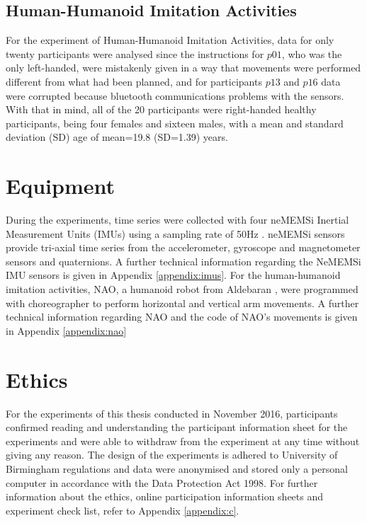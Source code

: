 \subsection{Human-Humanoid Imitation Activities}
For the experiment of Human-Humanoid Imitation Activities, 
data for only twenty participants were analysed since the instructions 
for $p01$, who was the only left-handed, were mistakenly given in a way 
that movements were performed different from what had been planned, 
and for participants $p13$ and $p16$ data were corrupted because 
bluetooth communications problems with the sensors. 
With that in mind, all of the 20 participants were right-handed 
healthy participants, being four females and sixteen males, with 
a mean and standard deviation (SD) age of mean=19.8 (SD=1.39) years.





\section{Equipment}
During the experiments, time series were collected with four neMEMSi 
Inertial Measurement Units (IMUs) using a sampling rate of 50Hz 
\citep{Comotti2014}. neMEMSi sensors provide tri-axial time series from 
the accelerometer, gyroscope and magnetometer sensors and quaternions.
A further technical information regarding the NeMEMSi IMU sensors is 
given in Appendix \ref{appendix:imus}.
For the human-humanoid imitation activities, NAO, a humanoid robot from 
Aldebaran \citep{gouaillier2009}, were programmed with choreographer 
to perform horizontal and vertical arm movements.
A further technical information regarding NAO and the code of NAO's
movements is given in Appendix \ref{appendix:nao}



\section{Ethics}
For the experiments of this thesis conducted in November 2016, 
participants confirmed reading and understanding the participant information 
sheet for the experiments and were able to withdraw from the experiment 
at any time without giving any reason.
The design of the experiments is adhered to University of Birmingham 
regulations and data were anonymised and stored only a personal 
computer in accordance with the Data Protection Act 1998.
For further information about the ethics, online participation 
information sheets and experiment check list, refer to 
Appendix \ref{appendix:c}.


